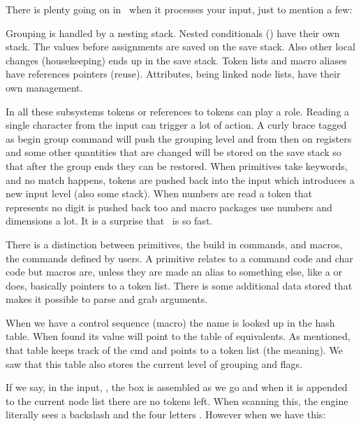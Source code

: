 There is plenty going on in \TEX\ when it processes your input, just to mention a
few:

\startitemize[packed]
\startitem Grouping is handled by a nesting stack. \stopitem
\startitem Nested conditionals () have their own stack. \stopitem
\startitem The values before assignments are saved on the save stack. \stopitem
\startitem Also other local changes (housekeeping) ends up in the save stack. \stopitem
\startitem Token lists and macro aliases have references pointers (reuse). \stopitem
\startitem Attributes, being linked node lists, have their own management. \stopitem
\stopitemize

In all these subsystems tokens or references to tokens can play a role. Reading a
single character from the input can trigger a lot of action. A curly brace tagged
as begin group command will push the grouping level and from then on registers
and some other quantities that are changed will be stored on the save stack
so that after the group ends they can be restored. When primitives take keywords,
and no match happens, tokens are pushed back into the input which introduces a
new input level (also some stack). When numbers are read a token that represents
no digit is pushed back too and macro packages use numbers and dimensions a lot.
It is a surprise that \TEX\ is so fast.

\stopsectionlevel

\startsectionlevel[title=Macros]

There is a distinction between primitives, the build in commands, and macros, the
commands defined by users. A primitive relates to a command code and char code
but macros are, unless they are made an alias to something else, like a \type
{\countdef} or \type {\let} does, basically pointers to a token list. There is
some additional data stored that makes it possible to parse and grab arguments.

When we have a control sequence (macro) \type {\controlsequence} the name is
looked up in the hash table. When found its value will point to the table of
equivalents. As mentioned, that table keeps track of the cmd and points to a
token list (the meaning). We saw that this table also stores the current level
of grouping and flags.

If we say, in the input, , the box is assembled as we
go and when it is appended to the current node list there are no tokens left.
When scanning this, the engine literally sees a backslash and the four letters
. However when we have this:

